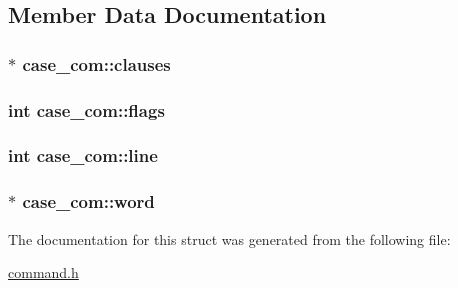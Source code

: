 \subsection{Member Data Documentation}
\subsubsection[{\texorpdfstring{clauses}{clauses}}]{$\ast$ case\+\_\+com\+::clauses}\hypertarget{structcase__com_a68bcee3c7e8750f04e632c0178dbb574}{}\label{structcase__com_a68bcee3c7e8750f04e632c0178dbb574}
\subsubsection[{\texorpdfstring{flags}{flags}}]{\setlength{\rightskip}{0pt plus 5cm}int case\+\_\+com\+::flags}\hypertarget{structcase__com_a7c1331e9e068cc68d7202a5258a9b99f}{}\label{structcase__com_a7c1331e9e068cc68d7202a5258a9b99f}
\subsubsection[{\texorpdfstring{line}{line}}]{\setlength{\rightskip}{0pt plus 5cm}int case\+\_\+com\+::line}\hypertarget{structcase__com_a224481775fc2b0ae54084676a332eaf2}{}\label{structcase__com_a224481775fc2b0ae54084676a332eaf2}
\subsubsection[{\texorpdfstring{word}{word}}]{$\ast$ case\+\_\+com\+::word}\hypertarget{structcase__com_a73c5c1e3d71a7d4615708e5b6afd4e34}{}\label{structcase__com_a73c5c1e3d71a7d4615708e5b6afd4e34}


The documentation for this struct was generated from the following file\+:\begin{DoxyCompactItemize}
\item 
\hyperlink{command_8h}{command.\+h}\end{DoxyCompactItemize}
